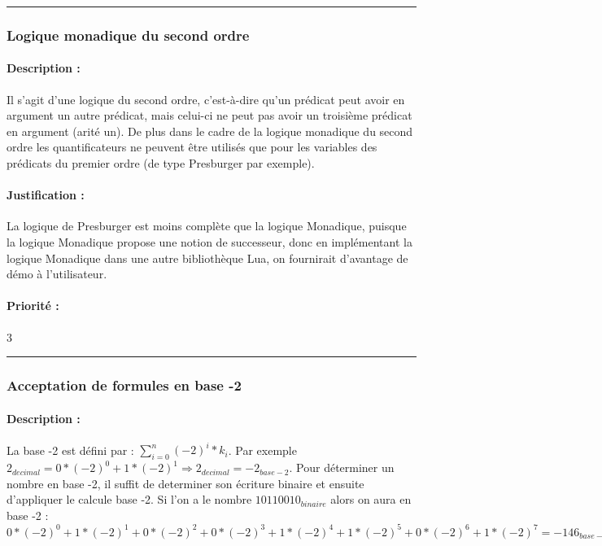 \documentclass{article}%
\begin{document}
\rule{\linewidth}{1pt}

\subsubsection{Logique monadique du second ordre}

\paragraph{Description :} Il s'agit d'une logique du second ordre, c'est-à-dire qu'un prédicat peut avoir en argument un autre prédicat, mais celui-ci ne peut pas avoir un troisième prédicat en argument (arité un). De plus dans le cadre de la logique monadique du second ordre les quantificateurs ne peuvent être utilisés que pour les variables des prédicats du premier ordre (de type Presburger par exemple).

\paragraph{Justification :} La logique de Presburger est moins complète que la logique Monadique, puisque la logique Monadique propose une notion de successeur, donc en implémentant la logique Monadique dans une autre bibliothèque Lua, on fournirait d'avantage de démo à l'utilisateur.

\paragraph{Priorité :} 3\\

\rule{\linewidth}{1pt}

\subsubsection{Acceptation de formules en base -2}

\paragraph{Description :} La base -2 est défini par : $ \sum\limits_{i=0}^n (-2)^i * k_i$. Par exemple $2_{decimal} = 0 * (-2)^0 + 1 * (-2)^1 \Rightarrow 2_{decimal} = -2_{base - 2}$. Pour déterminer un nombre en base -2, il suffit de determiner son écriture binaire et ensuite d'appliquer le calcule base -2. Si l'on a le nombre $10110010_{binaire}$ alors on aura en base -2 : $0 * (-2)^0 + 1 * (-2)^1 + 0 * (-2)^2 + 0 * (-2)^3 + 1 * (-2)^4 + 1 * (-2)^5 + 0 * (-2)^6 + 1 * (-2)^7 = -146_{base - 2}$
\end{document}
